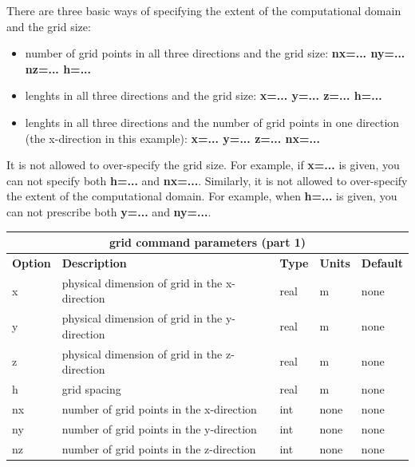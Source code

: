 \documentclass[11pt]{report}
\begin{document}
{There are three basic ways of specifying the extent of the computational domain and the grid size:
\begin{itemize}
	\item number of grid points in all three directions and the grid size: {\bf nx=... ny=... nz=... h=...}
	\item lenghts in all three directions and the grid size: {\bf x=... y=... z=... h=...}
	\item lenghts in all three directions and the number of grid points in one direction (the
	      x-direction in this example): {\bf x=... y=... z=... nx=...}
\end{itemize}
It is not allowed to over-specify the grid size. For example, if {\bf x=...} is given, you can not
specify both {\bf h=...} and {\bf nx=...}. Similarly, it is not allowed to over-specify the extent
of the computational domain. For example, when {\bf h=...} is given, you can not prescribe both {\bf
		y=...} and {\bf ny=...}.
%
\begin{center}
	\begin{tabular}{|l|p{8cm}|l|l|l|} \hline
		\multicolumn{5}{|c|}{\bf grid command parameters (part 1)}                                          \\ \hline
		\bf{Option} & \bf{Description}                              & \bf{Type} & \bf{Units} & \bf{Default} \\ \hline \hline
		x           & physical dimension of grid in the x-direction & real      & m          & none         \\ \hline
		y           & physical dimension of grid in the y-direction & real      & m          & none         \\ \hline
		z           & physical dimension of grid in the z-direction & real      & m          & none         \\ \hline
		\hline
		h           & grid spacing                                  & real      & m          & none         \\ \hline
		\hline
		nx          & number of grid points in the x-direction      & int       & none       & none         \\ \hline
		ny          & number of grid points in the y-direction      & int       & none       & none         \\ \hline
		nz          & number of grid points in the z-direction      & int       & none       & none         \\ \hline
	\end{tabular}
\end{center}

}
\end{document}
